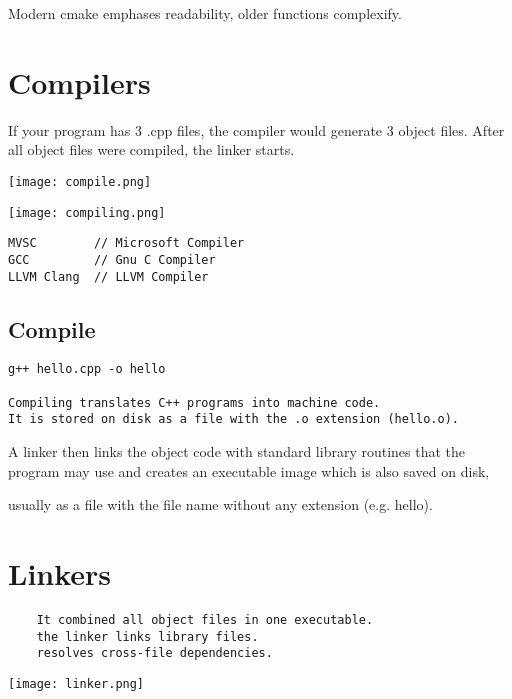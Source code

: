 \documentclass[openany]{report}
\begin{document}
Modern cmake emphases readability, older functions complexify.

\section{Compilers}

If your program has 3 .cpp files, the compiler would generate 3 object files. 
After all object files were compiled, the linker starts. 

\begin{center}
\texttt{[image: compile.png]}
\end{center}

\begin{center}
\texttt{[image: compiling.png]}
\end{center}

\begin{verbatim}
MVSC        // Microsoft Compiler
GCC         // Gnu C Compiler
LLVM Clang  // LLVM Compiler
\end{verbatim}

\subsection{Compile}
\begin{verbatim}
g++ hello.cpp -o hello

Compiling translates C++ programs into machine code.
It is stored on disk as a file with the .o extension (hello.o). 
\end{verbatim}

A linker then links the object code with standard library routines
that the program may use and creates an executable image which is also saved on disk,

usually as a file with the file name without any extension (e.g. hello).

\section{Linkers}

\begin{verbatim}
    It combined all object files in one executable.
    the linker links library files. 
    resolves cross-file dependencies.  
\end{verbatim}

\begin{center}
\texttt{[image: linker.png]}
\end{center}
\end{document}
